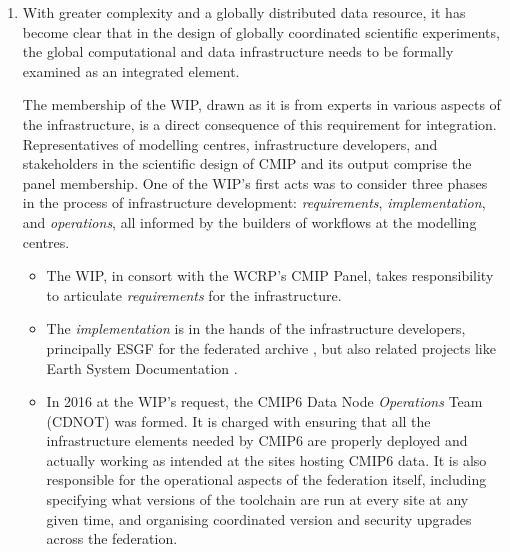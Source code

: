 \documentclass[gmd,manuscript]{copernicus}
\newcommand{\urlref}[2] {\href{#1}{#2}\footnote{\url{#1}, retrieved \today.}}
\begin{document}
\begin{enumerate}
\item With greater complexity and a globally distributed data
  resource, it has become clear that in the design of globally
  coordinated scientific experiments, the global computational and
  data infrastructure needs to be formally examined as an integrated
  element.
  
  The membership of the WIP, drawn as it is from experts in various
  aspects of the infrastructure, is a direct consequence of this
  requirement for integration. Representatives of modelling centres,
  infrastructure developers, and stakeholders in the scientific design
  of CMIP and its output comprise the panel membership. One of the
  WIP's first acts was to consider three phases in the process of
  infrastructure development: \emph{requirements},
  \emph{implementation}, and \emph{operations}, all informed by the
  builders of workflows at the modelling centres.
    
  \begin{itemize}
  \item The WIP, in consort with the WCRP's CMIP Panel, takes responsibility
    to articulate \emph{requirements} for the infrastructure.
  \item The \emph{implementation} is in the hands of the
    infrastructure developers, principally ESGF for the federated
    archive \citep{ref:williamsetal2015}, but also related projects
    like Earth System Documentation
    \citep[\urlref{https://goo.gl/WNwKD9}{ES-DOC},][]{ref:guilyardietal2013}.
  \item In 2016 at the WIP's request, the CMIP6 Data Node
    \emph{Operations} Team (CDNOT) was formed.
    It is charged with ensuring that all the infrastructure elements
    needed by CMIP6 are properly deployed and actually working as
    intended at the sites hosting CMIP6 data. It is also responsible
    for the operational aspects of the federation itself, including
    specifying what versions of the toolchain are run at every site at
    any given time, and organising coordinated version  and security
    upgrades across the federation.
  \end{itemize}


\end{enumerate}
\end{document}
